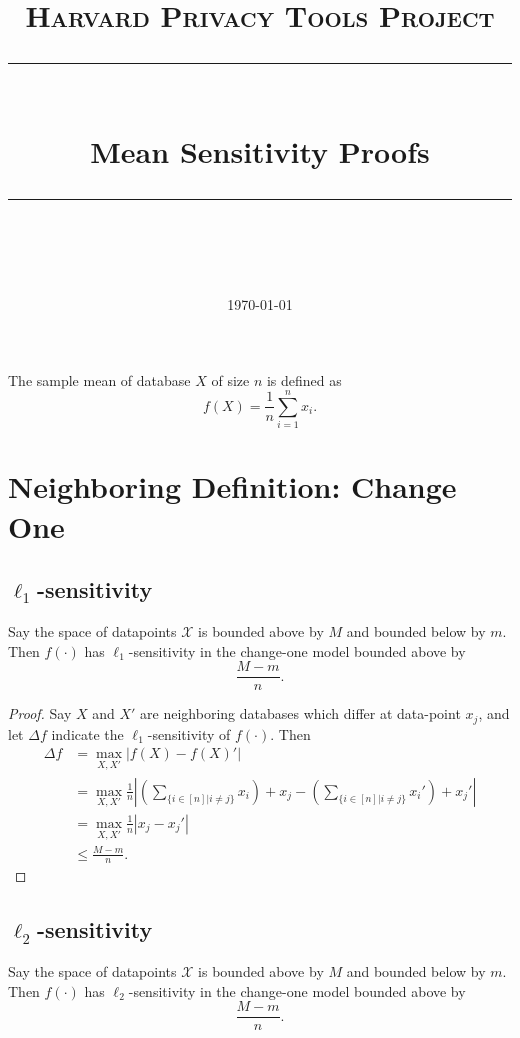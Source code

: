 \documentclass[11pt]{scrartcl} %
\title{
	\normalfont\normalsize
	\textsc{Harvard Privacy Tools Project}\\ %
	\vspace{25pt} %
	\rule{\linewidth}{0.5pt}\\ %
	\vspace{20pt} %
	{\huge Mean Sensitivity Proofs}\\ %
	\vspace{12pt} %
	\rule{\linewidth}{2pt}\\ %
	\vspace{12pt} %
}
\date{\normalsize\today} %
\begin{document}
\maketitle

\begin{definition}
The sample mean of database $X$ of size $n$ is defined as 
$$f(X) = \frac{1}{n} \sum_{i=1}^n x_i.$$
\end{definition}

\section{Neighboring Definition: Change One}

\subsection{$\ell_1$-sensitivity}
\begin{theorem}
Say the space of datapoints $\mathcal{X}$ is bounded above by $M$ and bounded below by $m$. Then $f(\cdot)$ has $\ell_1$-sensitivity in the change-one model bounded above by
$$ \frac{M-m}{n}.$$
\end{theorem}

\begin{proof}
Say $X$ and $X'$ are neighboring databases which differ at data-point $x_j$, and let $\Delta{f}$ indicate the $\ell_1$-sensitivity of $f(\cdot)$. Then
\begin{align*}
\Delta{f} &= \max_{X,X'} \left\vert f(X) - f(X)' \right\vert \\
	&=  \max_{X,X'} \frac{1}{n} \left\vert \left(\sum_{\{ i \in [n] \vert i \ne j\}} x_i\right) + x_j  - \left(\sum_{\{ i \in [n] \vert i \ne j\}} x_i'\right) + x_j'  \right\vert \\
	&= \max_{X,X'} \frac{1}{n} \left\vert x_j - x_j' \right\vert \\
	&\le \frac{M-m}{n}.
\end{align*}
\end{proof}

\subsection{$\ell_2$-sensitivity}
\begin{theorem}
	Say the space of datapoints $\mathcal{X}$ is bounded above by $M$ and bounded below by $m$.
	Then $f(\cdot)$ has $\ell_2$-sensitivity in the change-one model bounded above by
	 $$ \frac{M-m}{n}. $$
\end{theorem}
\end{document}
